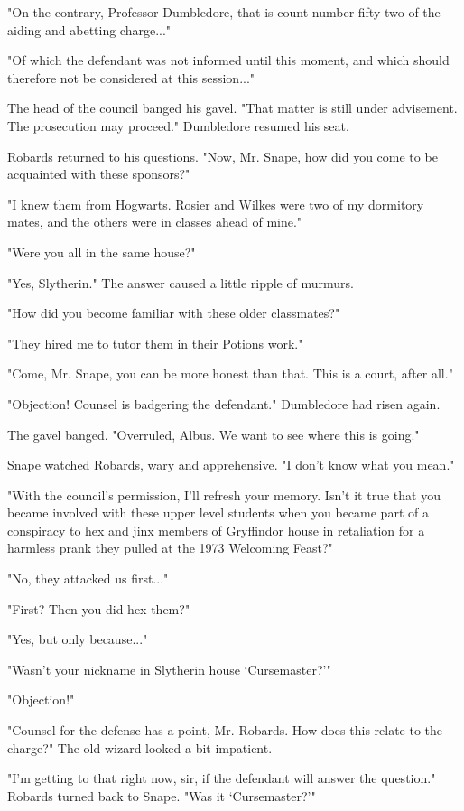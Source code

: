 \documentclass[a4paper,11pt]{article}
\begin{document}
"On the contrary, Professor Dumbledore, that is count number fifty-two of the aiding and abetting charge..."

"Of which the defendant was not informed until this moment, and which should therefore not be considered at this session..."

The head of the council banged his gavel. "That matter is still under advisement. The prosecution may proceed." Dumbledore resumed his seat.

Robards returned to his questions. "Now, Mr. Snape, how did you come to be acquainted with these sponsors?"

"I knew them from Hogwarts. Rosier and Wilkes were two of my dormitory mates, and the others were in classes ahead of mine."

"Were you all in the same house?"

"Yes, Slytherin." The answer caused a little ripple of murmurs.

"How did you become familiar with these older classmates?"

"They hired me to tutor them in their Potions work."

"Come, Mr. Snape, you can be more honest than that. This is a court, after all."

"Objection! Counsel is badgering the defendant." Dumbledore had risen again.

The gavel banged. "Overruled, Albus. We want to see where this is going."

Snape watched Robards, wary and apprehensive. "I don't know what you mean."

"With the council's permission, I'll refresh your memory. Isn't it true that you became involved with these upper level students when you became part of a conspiracy to hex and jinx members of Gryffindor house in retaliation for a harmless prank they pulled at the 1973 Welcoming Feast?"

"No, they attacked us first..."

"First? Then you did hex them?"

"Yes, but only because..."

"Wasn't your nickname in Slytherin house `Cursemaster?'"

"Objection!"

"Counsel for the defense has a point, Mr. Robards. How does this relate to the charge?" The old wizard looked a bit impatient.

"I'm getting to that right now, sir, if the defendant will answer the question." Robards turned back to Snape. "Was it `Cursemaster?'"
\end{document}
